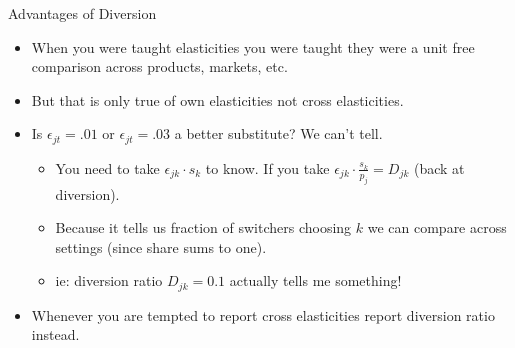 \documentclass[xcolor=pdftex,dvipsnames,table,mathserif,aspectratio=169]{beamer}
\begin{document}
\begin{frame}{Advantages of Diversion}
\begin{itemize}
\item When you were taught elasticities you were taught they were a \alert{unit free} comparison across products, markets, etc.
\item But that is only true of \alert{own elasticities} not cross elasticities.
\item Is $\epsilon_{jt}=.01$ or $\epsilon_{jt}=.03$ a better substitute? We can't tell.
\begin{itemize}
\item You need to take $\epsilon_{jk} \cdot s_k$ to know. If you take $\epsilon_{jk} \cdot \frac{s_k}{p_j} = D_{jk}$ (back at diversion).
\item Because it tells us \alert{fraction of switchers} choosing $k$ we can compare across settings (since share sums to one).
\item ie: diversion ratio $D_{jk} = 0.1$ actually tells me something!
\end{itemize}
\item Whenever you are tempted to report \alert{cross elasticities} report \alert{diversion ratio} instead.
\end{itemize}
\end{frame}




\end{document}
